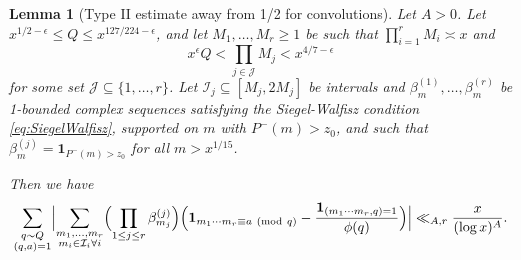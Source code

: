 \documentclass[10pt]{amsart}
\theoremstyle{plain}
\newtheorem{lmm}[thrm]{Lemma}
\numberwithin{equation}{section}
\newcommand{\Mod}[1]{\ (\mathrm{mod}\ #1)}
\begin{document}
%
%
%
%
%
%
%
%
\begin{lmm}[Type II estimate away from 1/2 for convolutions]\label{lmm:TypeIIAway}
Let $A>0$. Let $x^{1/2-\epsilon}\le Q\le x^{127/224-\epsilon}$, and let $M_1, \dots , M_r\ge 1$ be such that $\prod_{i=1}^r M_i\asymp x$ and
\[
x^{\epsilon}Q <\prod_{j\in\mathcal{J}} M_j<x^{4/7-\epsilon}
\]
for some set $\mathcal{J}\subseteq\{1,\dots,r\}$.  Let $\mathcal{I}_j\subseteq [M_j,2M_j]$ be intervals and $\beta^{(1)}_m,\dots,\beta_m^{(r)}$ be 1-bounded complex sequences satisfying the Siegel-Walfisz condition \eqref{eq:SiegelWalfisz}, supported on $m$ with $P^-(m)>z_0$, and such that $\beta_m^{(j)}=\mathbf{1}_{P^-(m)>z_0}$ for all $m>x^{1/15}$.

Then we have 
 \[
  \sum_{\substack{q\sim Q\\ (q,a)=1}}\Bigl|\sum_{\substack{m_{1},\dots, m_{r}\\ m_{i}\in \mathcal{I}_i\forall i}}\Bigl(\prod_{1\le j\le r}\beta^{(j)}_{m_j}\Bigr)\Bigl(\mathbf{1}_{m_1\cdots m_r\equiv a\Mod{q}}-\frac{\mathbf{1}_{(m_1\cdots m_r,q)=1}}{\phi(q)}\Bigr)\Bigr|\ll_{A,r}\frac{x}{(\log{x})^{A}}.
 \]
\end{lmm}
%
%
%
%
\end{document}
